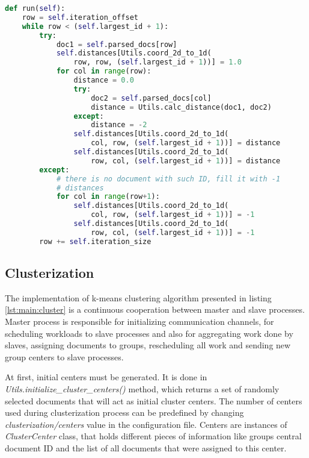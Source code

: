 \begin{lstlisting}[language=Python, caption={Distance.run() - Distance class process main method}, label={lst:distance:run}]
def run(self):
    row = self.iteration_offset
    while row < (self.largest_id + 1):
        try:
            doc1 = self.parsed_docs[row]
            self.distances[Utils.coord_2d_to_1d(
	            row, row, (self.largest_id + 1))] = 1.0
            for col in range(row):
                distance = 0.0
                try:
                    doc2 = self.parsed_docs[col]
                    distance = Utils.calc_distance(doc1, doc2)
                except:
                    distance = -2
                self.distances[Utils.coord_2d_to_1d(
	                col, row, (self.largest_id + 1))] = distance
                self.distances[Utils.coord_2d_to_1d(
	                row, col, (self.largest_id + 1))] = distance
        except:
            # there is no document with such ID, fill it with -1
            # distances
            for col in range(row+1):
                self.distances[Utils.coord_2d_to_1d(
	                col, row, (self.largest_id + 1))] = -1
                self.distances[Utils.coord_2d_to_1d(
	                row, col, (self.largest_id + 1))] = -1
        row += self.iteration_size
\end{lstlisting}

\subsection{Clusterization} \label{impl:clusterization}

The implementation of k-means clustering algorithm presented in listing \ref{lst:main:cluster} is a continuous cooperation between master and slave processes. Master process is responsible for initializing communication channels, for scheduling workloads to slave processes and also for aggregating work done by slaves, assigning documents to groups, rescheduling all work and sending new group centers to slave processes.

At first, initial centers must be generated. It is done in \textit{Utils.initialize\_cluster\_centers()} method, which returns a set of randomly selected documents that will act as initial cluster centers. The number of centers used during clusterization process can be predefined by changing \textit{clusterization/centers} value in the configuration file. Centers are instances of \textit{ClusterCenter} class, that holds different pieces of information like groups central document ID and the list of all documents that were assigned to this center.

